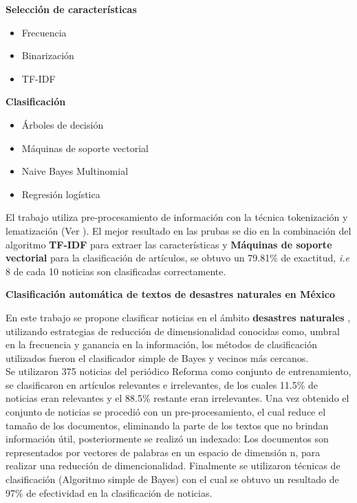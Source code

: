 \textbf{Selección de características}

\begin{itemize}
	\item Frecuencia
	\item Binarización
	\item TF-IDF
\end{itemize}

\textbf{Clasificación}

\begin{itemize}
	\item Árboles de decisión
	\item Máquinas de soporte vectorial
	\item Naive Bayes Multinomial
	\item Regresión logística
\end{itemize}

El trabajo utiliza  pre-procesamiento de información con la técnica tokenización y lematización (Ver ). El mejor resultado en las prubas se dio en la combinación del algoritmo \textbf{TF-IDF} para extraer las características y \textbf{Máquinas de soporte vectorial} para la clasificación de artículos, se obtuvo un 79.81\% de exactitud, \textit{i.e} 8 de cada 10 noticias son clasificadas correctamente.\\



\begin{large}
	 \textbf{Clasificación automática de textos de desastres naturales en México}\\
\end{large}

En este trabajo se propone clasificar noticias en el ámbito \textbf{desastres naturales} \citep{CD9}, utilizando estrategias de reducción de dimensionalidad conocidas como, umbral en la frecuencia y ganancia en la información, los métodos de clasificación utilizados fueron el clasificador simple de Bayes y vecinos más cercanos.\\

Se utilizaron 375 noticias del periódico Reforma como conjunto de entrenamiento, se clasificaron en artículos relevantes e irrelevantes, de los cuales 11.5\% de noticias eran relevantes y el 88.5\% restante eran irrelevantes. Una vez obtenido el conjunto de noticias se procedió con un pre-procesamiento, el cual reduce el tamaño de los documentos, eliminando la parte de los textos que no brindan información útil, posteriormente se realizó un indexado: Los documentos son representados por vectores de palabras en un espacio de dimensión n, para realizar una reducción de dimencionalidad. Finalmente se utilizaron técnicas de clasificación (Algoritmo simple de Bayes) con el cual se obtuvo un resultado de 97\% de efectividad en la clasificación de noticias.\\

